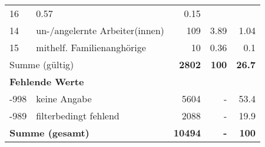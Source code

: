 \begin{longtable}{lXrrr}
       \num{16} &
       \num[round-mode=places,round-precision=2]{0,57} &
         \num[round-mode=places,round-precision=2]{0,15} \\

     14 &
     \multicolumn{1}{X}{ un-/angelernte Arbeiter(innen)   } &


       \num{109} &
       \num[round-mode=places,round-precision=2]{3,89} &
         \num[round-mode=places,round-precision=2]{1,04} \\

     15 &
     \multicolumn{1}{X}{ mithelf. Familienanghörige   } &


       \num{10} &
       \num[round-mode=places,round-precision=2]{0,36} &
         \num[round-mode=places,round-precision=2]{0,1} \\
     \midrule
     \multicolumn{2}{l}{Summe (gültig)} &
       \textbf{\num{2802}} &
     \textbf{100} &
       \textbf{\num[round-mode=places,round-precision=2]{26,7}} \\
     \multicolumn{5}{l}{\textbf{Fehlende Werte}}\\
       -998 &
       keine Angabe &
         \num{5604} &
        - &
         \num[round-mode=places,round-precision=2]{53,4} \\
       -989 &
       filterbedingt fehlend &
         \num{2088} &
        - &
         \num[round-mode=places,round-precision=2]{19,9} \\
     \midrule
     \multicolumn{2}{l}{\textbf{Summe (gesamt)}} &
          \textbf{\num{10494}} &
        \textbf{-} &
        \textbf{100} \\
     \bottomrule
     \end{longtable}
     
